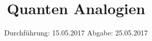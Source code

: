 

\subject{V23}
\title{Quanten Analogien}
\date{
  Durchführung: 15.05.2017
  \hspace{3em}
  Abgabe: 25.05.2017
}



\maketitle
\thispagestyle{empty}
\tableofcontents
\newpage






\printbibliography


